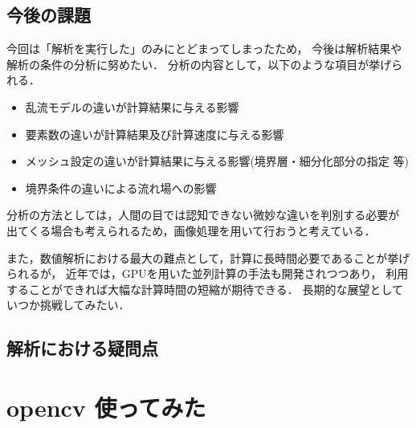 \documentclass[twocolumn,a4j]{jsarticle}
\begin{document}
\subsection{今後の課題}
今回は「解析を実行した」のみにとどまってしまったため，
今後は解析結果や解析の条件の分析に努めたい．
分析の内容として，以下のような項目が挙げられる．
\begin{itemize}
    \item 乱流モデルの違いが計算結果に与える影響
    \item 要素数の違いが計算結果及び計算速度に与える影響
    \item メッシュ設定の違いが計算結果に与える影響(境界層・細分化部分の指定 等)
    \item 境界条件の違いによる流れ場への影響
\end{itemize}
\par
分析の方法としては，人間の目では認知できない微妙な違いを判別する必要が
出てくる場合も考えられるため，画像処理を用いて行おうと考えている．
\par
また，数値解析における最大の難点として，計算に長時間必要であることが挙げられるが，
近年では，GPUを用いた並列計算の手法も開発されつつあり，
利用することができれば大幅な計算時間の短縮が期待できる．
長期的な展望としていつか挑戦してみたい．
\subsection{解析における疑問点}
\section{\large opencv 使ってみた}
\end{document}
